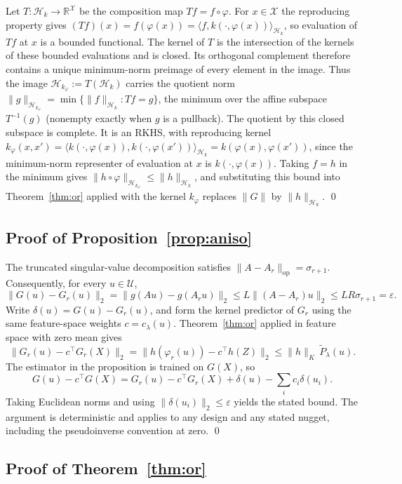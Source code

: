 Let $T:\mathcal H_k\to\mathbb R^{\mathcal X}$ be the composition map
$Tf=f\circ\varphi$. For $x\in\mathcal X$ the reproducing property gives
$(Tf)(x)=f(\varphi(x))=\langle f,k(\cdot,\varphi(x))\rangle_{\mathcal H_k}$,
so evaluation of $Tf$ at $x$ is a bounded functional. The kernel of $T$ is
the intersection of the kernels of these bounded evaluations and is closed.
Its orthogonal complement therefore contains a unique minimum-norm preimage
of every element in the image. Thus the image
$\mathcal H_{k_\varphi}:=T(\mathcal H_k)$ carries the quotient norm
$\|g\|_{\mathcal H_{k_\varphi}}=\min\{\|f\|_{\mathcal H_k}:Tf=g\}$, the minimum
over the affine subspace $T^{-1}(g)$ (nonempty exactly when $g$ is a pullback).
The quotient by this closed subspace is complete. It is an RKHS, with reproducing kernel
$k_\varphi(x,x')=\langle k(\cdot,\varphi(x)),k(\cdot,\varphi(x'))\rangle_{\mathcal H_k}
=k(\varphi(x),\varphi(x'))$, since the minimum-norm representer of evaluation
at $x$ is $k(\cdot,\varphi(x))$. Taking $f=h$ in the minimum gives
$\|h\circ\varphi\|_{\mathcal H_{k_\varphi}}\le\|h\|_{\mathcal H_k}$, and
substituting this bound into Theorem~\ref{thm:or} applied with the kernel
$k_\varphi$ replaces $\|G\|$ by $\|h\|_{\mathcal H_k}$. \qed

\subsection{Proof of Proposition~\ref{prop:aniso}}
\label{proof:prop:aniso}

The truncated singular-value decomposition satisfies
$\|A-A_r\|_{\mathrm{op}}=\sigma_{r+1}$. Consequently, for every
$u\in\mathcal U$,
\[
\|G(u)-G_r(u)\|_2
=\|g(Au)-g(A_ru)\|_2
\le L\|(A-A_r)u\|_2
\le LR\sigma_{r+1}=\varepsilon.
\]
Write $\delta(u)=G(u)-G_r(u)$, and form the kernel predictor of $G_r$
using the same feature-space weights $c=c_\lambda(u)$. Theorem~\ref{thm:or}
applied in feature space with zero mean gives
\[
\|G_r(u)-c^\top G_r(X)\|_2
=\|h(\varphi_r(u))-c^\top h(Z)\|_2
\le\|h\|_K\,\widetilde P_\lambda(u).
\]
The estimator in the proposition is trained on $G(X)$, so
\[
G(u)-c^\top G(X)
=G_r(u)-c^\top G_r(X)+\delta(u)-\sum_i c_i\delta(u_i).
\]
Taking Euclidean norms and using $\|\delta(u_i)\|_2\le\varepsilon$
yields the stated bound. The argument is deterministic and applies to any
design and any stated nugget, including the pseudoinverse convention at zero.
\qed

\subsection{Proof of Theorem~\ref{thm:or}}
\label{proof:thm:or}

